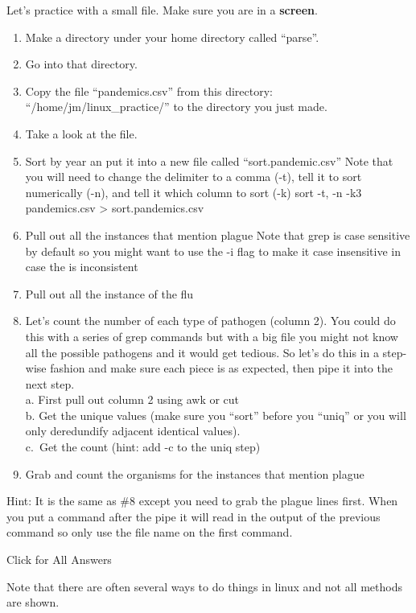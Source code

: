 \documentclass[
]{book}
\begin{document}
Let's practice with a small file. Make sure you are in a \textbf{screen}.

\begin{enumerate}
\def\labelenumi{\arabic{enumi}.}
\item
  Make a directory under your home directory called ``parse''.
\item
  Go into that directory.
\item
  Copy the file ``pandemics.csv'' from this directory: ``/home/jm/linux\_practice/'' to the directory you just made.
\item
  Take a look at the file.
\item
  Sort by year an put it into a new file called ``sort.pandemic.csv''
  Note that you will need to change the delimiter to a comma (-t), tell it to sort numerically (-n), and tell it which column to sort (-k) sort -t, -n -k3 pandemics.csv \textgreater{} sort.pandemics.csv
\item
  Pull out all the instances that mention plague
  Note that grep is case sensitive by default so you might want to use the -i flag to make it case insensitive in case the is inconsistent
\item
  Pull out all the instance of the flu
\item
  Let's count the number of each type of pathogen (column 2). You could do this with a series of grep commands but with a big file you might not know all the possible pathogens and it would get tedious. So let's do this in a step-wise fashion and make sure each piece is as expected, then pipe it into the next step.\\
  a. First pull out column 2 using awk or cut\\
  b. Get the unique values (make sure you ``sort'' before you ``uniq'' or you will only deredundify adjacent identical values).\\
  c.~Get the count (hint: add -c to the uniq step)
\item
  Grab and count the organisms for the instances that mention plague
\end{enumerate}

Hint: It is the same as \#8 except you need to grab the plague lines first. When you put a command after the pipe it will read in the output of the previous command so only use the file name on the first command.

Click for All Answers

Note that there are often several ways to do things in linux and not all methods are shown.
\end{document}
